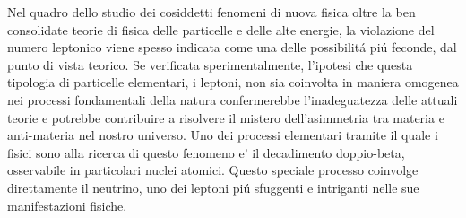 
Nel quadro dello studio dei cosiddetti fenomeni di nuova fisica oltre la ben consolidate
teorie di fisica delle particelle e delle alte energie, la violazione del numero leptonico
viene spesso indicata come una delle possibilit\'a pi\'u feconde, dal punto di vista
teorico. Se verificata sperimentalmente, l'ipotesi che questa tipologia di particelle
elementari, i leptoni, non sia coinvolta in maniera omogenea nei processi fondamentali della
natura confermerebbe l'inadeguatezza delle attuali teorie e potrebbe contribuire a
risolvere il mistero dell'asimmetria tra materia e anti-materia nel nostro universo. Uno
dei processi elementari tramite il quale i fisici sono alla ricerca di questo fenomeno e' il
decadimento doppio-beta, osservabile in particolari nuclei atomici. Questo speciale
processo coinvolge direttamente il neutrino, uno dei leptoni pi\'u sfuggenti e intriganti
nelle sue manifestazioni fisiche.

